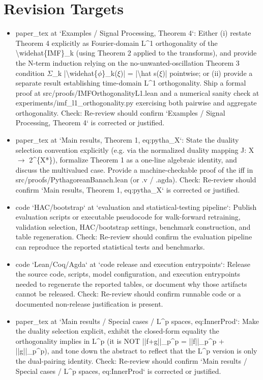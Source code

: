 \documentclass[11pt]{article}
\begin{document}
\section*{Revision Targets}
\begin{itemize}[leftmargin=*]
  \item [open] paper\_tex at `Examples / Signal Processing, Theorem 4`: Either (i) restate Theorem 4 explicitly as Fourier-domain L\^{}1 orthogonality of the \textbackslash{}widehat\{IMF\}\_k (using Theorem 2 applied to the transforms), and provide the N-term induction relying on the no-unwanted-oscillation Theorem 3 condition \ensuremath{\Sigma}\_k |\textbackslash{}widehat\{\ensuremath{\phi}\}\_k(\ensuremath{\xi})| = |\textbackslash{}hat s(\ensuremath{\xi})| pointwise; or (ii) provide a separate result establishing time-domain L\^{}1 orthogonality. Ship a formal proof at src/proofs/IMFOrthogonalityL1.lean and a numerical sanity check at experiments/imf\_l1\_orthogonality.py exercising both pairwise and aggregate orthogonality. Check: Re-review should confirm `Examples / Signal Processing, Theorem 4` is corrected or justified.
  \item [open] paper\_tex at `Main results, Theorem 1, eq:pytha\_X`: State the duality selection convention explicitly (e.g. via the normalized duality mapping J: X \ensuremath{\to} 2\^{}\{X*\}), formalize Theorem 1 as a one-line algebraic identity, and discuss the multivalued case. Provide a machine-checkable proof of the iff in src/proofs/PythagoreanBanach.lean (or .v / .agda). Check: Re-review should confirm `Main results, Theorem 1, eq:pytha\_X` is corrected or justified.
  \item [open] code `HAC/bootstrap` at `evaluation and statistical-testing pipeline`: Publish evaluation scripts or executable pseudocode for walk-forward retraining, validation selection, HAC/bootstrap settings, benchmark construction, and table regeneration. Check: Re-review should confirm the evaluation pipeline can reproduce the reported statistical tests and benchmarks.
  \item [open] code `Lean/Coq/Agda` at `code release and execution entrypoints`: Release the source code, scripts, model configuration, and execution entrypoints needed to regenerate the reported tables, or document why those artifacts cannot be released. Check: Re-review should confirm runnable code or a documented non-release justification is present.
  \item [open] paper\_tex at `Main results / Special cases / L\^{}p spaces, eq:InnerProd`: Make the duality selection explicit, exhibit the closed-form equality the orthogonality implies in L\^{}p (it is NOT ||f+g||\_p\^{}p = ||f||\_p\^{}p + ||g||\_p\^{}p), and tone down the abstract to reflect that the L\^{}p version is only the dual-pairing identity. Check: Re-review should confirm `Main results / Special cases / L\^{}p spaces, eq:InnerProd` is corrected or justified.

\end{itemize}
\end{document}
